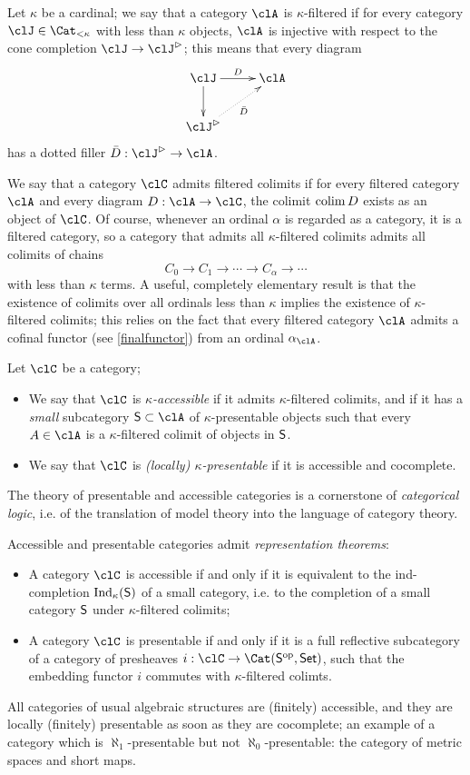 \documentclass{amsart}
\begin{document}
Let $\kappa$ be a cardinal; we say that a category $\clA$ is $\kappa$\hyp{}filtered if for every category $\clJ\in\Cat_{<\kappa}$ with less than $\kappa$ objects, $\clA$ is injective with respect to the cone completion $\clJ\to \clJ^\rhd$; this means that every diagram
\[
  \vcenter{\xymatrix{
      \clJ\ar[d]\ar[r]^D & \clA \\
      \clJ^\rhd\ar@{.>}[ur]_{\bar D}
    }}
\]
has a dotted filler $\bar D : \clJ^\rhd \to \clA$.

We say that a category $\clC$ admits filtered colimits if for every filtered category $\clA$ and every diagram $D : \clA \to \clC$, the colimit $\operatorname{colim} D$ exists as an object of $\clC$. Of course, whenever an ordinal $\alpha$ is regarded as a category, it is a filtered category, so a category that admits all $\kappa$\hyp{}filtered colimits admits all colimits of chains
\[
  C_0 \to C_1 \to \cdots \to C_\alpha \to\cdots
\]
with less than $\kappa$ terms. A useful, completely elementary result is that the existence of colimits over all ordinals less than $\kappa$ implies the existence of $\kappa$\hyp{}filtered colimits; this relies on the fact that every filtered category $\clA$ admits a cofinal functor (see \ref{finalfunctor}) from an ordinal $\alpha_\clA$.
\begin{definition}\label{accepre}
  Let $\clC$ be a category;
  \begin{itemize}
    \item We say that $\clC$ is \emph{$\kappa$\hyp{}accessible} if it admits $\kappa$\hyp{}filtered colimits, and if it has a \emph{small} subcategory $\cate{S}\subset \clA$ of $\kappa$\hyp{}presentable objects such that every $A\in\clA$ is a $\kappa$\hyp{}filtered colimit of objects in $\mathsf{S}$.
    \item We say that $\clC$ is \emph{(locally) $\kappa$\hyp{}presentable} if it is accessible and cocomplete.
  \end{itemize}
  The theory of presentable and accessible categories is a cornerstone of \emph{categorical logic}, i.e. of the translation of model theory into the language of category theory.

  Accessible and presentable categories admit \emph{representation theorems}:
  \begin{itemize}
    \item A category $\clC$ is accessible if and only if it is equivalent to the ind\hyp{}completion $\text{Ind}_\kappa(\mathsf{S})$ of a small category, i.e. to the completion of a small category $\mathsf{S}$ under  $\kappa$\hyp{}filtered colimits;
    \item A category $\clC$ is presentable if and only if it is a full reflective subcategory of a category of presheaves $i : \clC \to \Cat(\cate{S}^\op,\Set)$, such that the embedding functor $i$ commutes with $\kappa$\hyp{}filtered colimts.
  \end{itemize}
\end{definition}
All categories of usual algebraic structures are (finitely) accessible, and they are locally (finitely) presentable as soon as they are cocomplete; an example of a category which is $\aleph_1$\hyp{}presentable but not $\aleph_0$\hyp{}presentable: the category of metric spaces and short maps.
\end{document}
